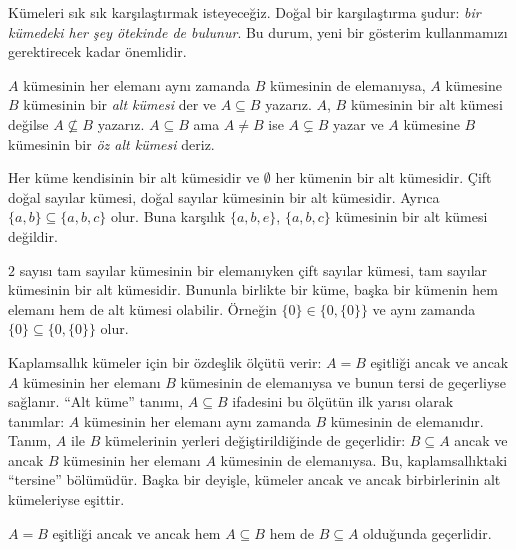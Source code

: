 


\begin{explain}
Kümeleri sık sık karşılaştırmak isteyeceğiz. Doğal bir karşılaştırma şudur:
\emph{bir kümedeki her şey ötekinde de bulunur}. Bu durum,
yeni bir gösterim kullanmamızı gerektirecek kadar önemlidir.
\end{explain}

\begin{defn}
$A$ kümesinin her elemanı aynı zamanda $B$ kümesinin de elemanıysa, $A$
kümesine $B$ kümesinin bir \emph{alt kümesi} der ve $A \subseteq B$ yazarız.
$A$, $B$ kümesinin bir alt kümesi değilse $A \not\subseteq B$ yazarız.
$A \subseteq B$ ama $A \neq B$ ise $A \subsetneq B$ yazar ve $A$ kümesine
$B$ kümesinin bir \emph{öz alt kümesi} deriz.
\end{defn}

\begin{ex}
Her küme kendisinin bir alt kümesidir ve $\emptyset$ her kümenin bir
alt kümesidir. Çift doğal sayılar kümesi, doğal sayılar kümesinin bir
alt kümesidir. Ayrıca $\{ a, b \} \subseteq \{ a, b, c \}$ olur. Buna karşılık
$\{ a, b, e \}$, $\{ a, b, c \}$ kümesinin bir alt kümesi değildir.
\end{ex}

\begin{ex}
$2$ sayısı tam sayılar kümesinin bir elemanıyken çift sayılar kümesi, tam
sayılar kümesinin bir alt kümesidir. Bununla birlikte bir küme, başka bir
kümenin hem elemanı hem de alt kümesi olabilir.
Örneğin $\{0\} \in \{0, \{0\}\}$ ve aynı zamanda
$\{0\} \subseteq \{0, \{0\}\}$ olur.
\end{ex}

Kaplamsallık kümeler için bir özdeşlik ölçütü verir: $A = B$ eşitliği ancak ve
ancak $A$ kümesinin her elemanı $B$ kümesinin de elemanıysa ve bunun tersi de
geçerliyse sağlanır. ``Alt küme'' tanımı, $A \subseteq B$ ifadesini bu ölçütün
ilk yarısı olarak tanımlar: $A$ kümesinin her elemanı aynı zamanda $B$
kümesinin de elemanıdır. Tanım, $A$ ile $B$ kümelerinin yerleri
değiştirildiğinde de geçerlidir: $B \subseteq A$ ancak ve ancak $B$ kümesinin
her elemanı $A$ kümesinin de elemanıysa. Bu, kaplamsallıktaki ``tersine''
bölümüdür. Başka bir deyişle, kümeler ancak ve ancak birbirlerinin alt
kümeleriyse eşittir.

\begin{prop}
$A = B$ eşitliği ancak ve ancak hem $A \subseteq B$ hem de $B \subseteq A$
olduğunda geçerlidir.
\end{prop}

